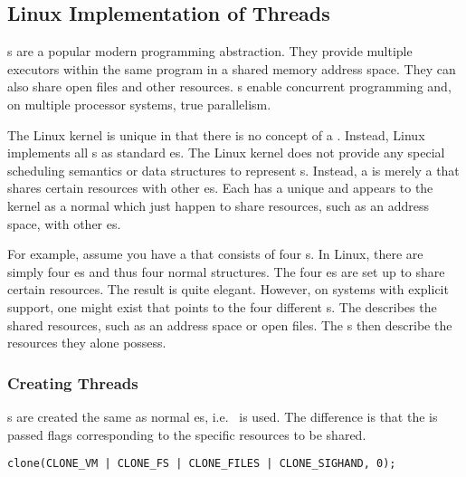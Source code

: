 \subsection{Linux Implementation of Threads}\label{subsec:Linux_Implementation_Threads}
s are a popular modern programming abstraction.
They provide multiple executors within the same program in a shared memory address space.
They can also share open files and other resources.
s enable concurrent programming and, on multiple processor systems, true parallelism.

The Linux kernel is unique in that there is no concept of a .
Instead, Linux implements all s as standard es.
The Linux kernel does not provide any special scheduling semantics or data structures to represent s.
Instead, a  is merely a  that shares certain resources with other es.
Each  has a unique  and appears to the kernel as a normal  which just happen to share resources, such as an address space, with other es.

For example, assume you have a  that consists of four s.
In Linux, there are simply four es and thus four normal  structures.
The four es are set up to share certain resources.
The result is quite elegant.
However, on systems with explicit  support, one  might exist that points to the four different s.
The  describes the shared resources, such as an address space or open files.
The s then describe the resources they alone possess.

\subsubsection{Creating Threads}\label{subsubsec:Creating_Threads}
s are created the same as normal es, i.e.\  is used.
The difference is that the   is passed flags corresponding to the specific resources to be shared.
\begin{verbatim}
clone(CLONE_VM | CLONE_FS | CLONE_FILES | CLONE_SIGHAND, 0);
\end{verbatim}

